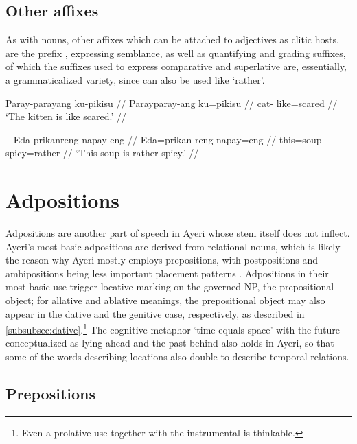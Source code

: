 \subsection{Other affixes}
\label{subsec:adjaffx}

As with nouns, other affixes which can be attached to adjectives as clitic 
hosts, are the prefix , expressing semblance, as well as 
quantifying and grading suffixes, of which the suffixes used to express 
comparative and superlative are, essentially, a grammaticalized variety, since 
 can also be used like `rather'.

\ex\begingl
	\gla Paray-parayang ku-pikisu //
	\glb Paray\til{}paray-ang ku=pikisu //
	\glc \Dim{}\til{}cat-\Aarg{} like=scared //
	\glft `The kitten is like scared.' //
\endgl\xe

\ex~\begingl
	\gla Eda-prikanreng napay-eng //
	\glb Eda=prikan-reng napay=eng //
	\glc this=soup-\AargI{} spicy=rather //
	\glft `This soup is rather spicy.' //
\endgl\xe



\section{Adpositions}

Adpositions are another part of speech in Ayeri whose stem itself does not 
inflect. Ayeri's most basic adpositions are derived from relational nouns, 
which is likely the reason why Ayeri mostly employs prepositions, with 
postpositions and ambipositions being less important placement patterns 
\parencites[110--111]{hagege2010}[81~ff.]{lehmann2015}. Adpositions in their 
most basic use trigger locative marking on the governed NP, the prepositional 
object; for allative and ablative meanings, the prepositional object may 
also appear in the dative and the genitive case, respectively, as described in 
\autoref{subsubsec:dative}.\footnote{Even a prolative use together with the 
instrumental is thinkable.} The cognitive metaphor `time equals space' 
with the future conceptualized as lying ahead and the past behind also holds in 
Ayeri, so that some of the words describing locations also double to describe 
temporal relations.

\subsection{Prepositions}

